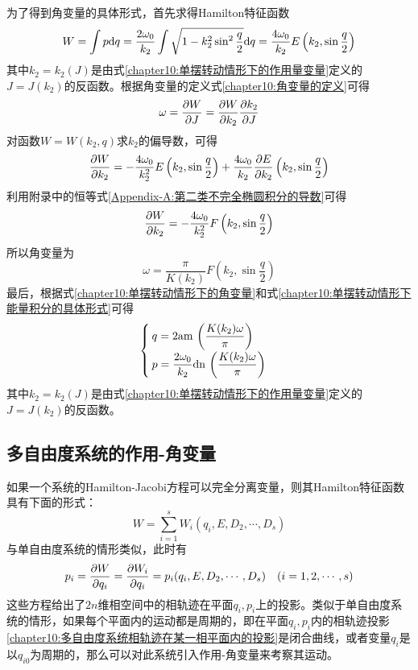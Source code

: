 为了得到角变量的具体形式，首先求得Hamilton特征函数
\begin{equation}
	W = \int p\mathrm{d} q = \frac{2\omega_0}{k_2} \int \sqrt{1-k_2^2\sin^2\frac q2}\mathrm{d} q = \frac{4\omega_0}{k_2} E\left(k_2, \sin\frac q2\right)
\end{equation}
其中$k_2=k_2(J)$是由式\eqref{chapter10:单摆转动情形下的作用量变量}定义的$J=J(k_2)$的反函数。根据角变量的定义式\eqref{chapter10:角变量的定义}可得
\begin{equation}
	\omega = \frac{\partial W}{\partial J} = \frac{\partial W}{\partial k_2} \frac{\partial k_2}{\partial J}
\end{equation}
对函数$W=W(k_2,q)$求$k_2$的偏导数，可得
\begin{equation}
	\frac{\partial W}{\partial k_2} = -\frac{4\omega_0}{k_2^2}E\left(k_2, \sin\frac q2\right) + \frac{4\omega_0}{k_2}\frac{\partial E}{\partial k_2}\left(k_2, \sin\frac q2\right)
\end{equation}
利用附录中的恒等式\eqref{Appendix-A:第二类不完全椭圆积分的导数}可得
\begin{equation}
	\frac{\partial W}{\partial k_2} = -\frac{4\omega_0}{k_2^2}F\left(k_2, \sin\frac q2\right)
\end{equation}
所以角变量为
\begin{equation}
	\omega = \frac{\pi}{K(k_2)}F\left(k_2,\sin\frac q2\right)
	\label{chapter10:单摆转动情形下的角变量}
\end{equation}
最后，根据式\eqref{chapter10:单摆转动情形下的角变量}和式\eqref{chapter10:单摆转动情形下能量积分的具体形式}可得
\begin{equation}
\begin{cases}
	\displaystyle q = 2\mathrm{am}\,\left(\frac{K(k_2)\omega}{\pi}\right) \\[1.5ex]
	\displaystyle p = \frac{2\omega_0}{k_2}\mathrm{dn}\,\left(\frac{K(k_2)\omega}{\pi}\right)
\end{cases}
\end{equation}
其中$k_2=k_2(J)$是由式\eqref{chapter10:单摆转动情形下的作用量变量}定义的$J=J(k_2)$的反函数。

\subsection{多自由度系统的作用-角变量}

如果一个系统的Hamilton-Jacobi方程可以完全分离变量，则其Hamilton特征函数具有下面的形式：
\begin{equation}
	W = \sum_{i=1}^s W_i(q_i,E,D_2,\cdots,D_s)
	\label{chapter10:多自由度系统的Hamilton特征函数}
\end{equation}
与单自由度系统的情形类似，此时有
\begin{equation}
	p_i = \frac{\partial W}{\partial q_i} = \frac{\partial W_i}{\partial q_i} = p_i(q_i,E,D_2,\cdots,D_s)\quad (i=1,2,\cdots,s)
	\label{chapter10:多自由度系统相轨迹在某一相平面内的投影}
\end{equation}
这些方程给出了$2n$维相空间中的相轨迹在平面$q_i,p_i$上的投影。类似于单自由度系统的情形，如果每个平面内的运动都是周期的，即在平面$q_i,p_i$内的相轨迹投影\eqref{chapter10:多自由度系统相轨迹在某一相平面内的投影}是闭合曲线，或者变量$q_i$是以$q_{i0}$为周期的，那么可以对此系统引入作用-角变量来考察其运动。

